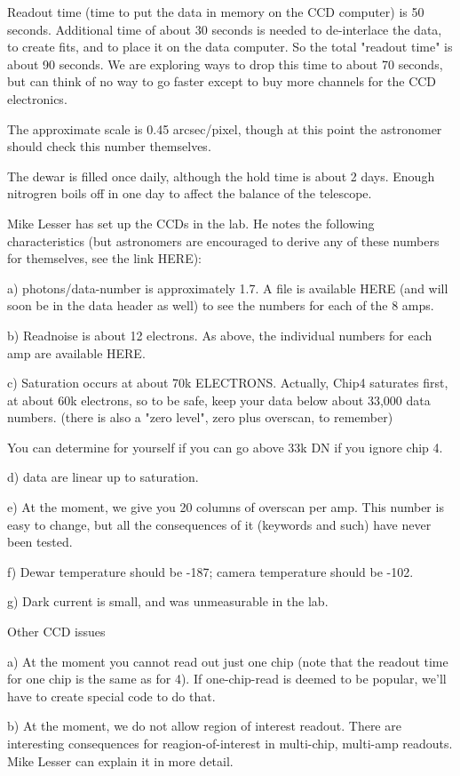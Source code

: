 \documentclass[letterpaper,12pt]{article}
\begin{document}
Readout time (time to put the data in memory on
the CCD computer) is 50 seconds. Additional time of about 30 seconds is
needed to de-interlace the data, to create fits, and to place it
on the data computer. So the total "readout time" is about
90 seconds. We are exploring ways to drop this time to about
70 seconds, but can think of no way to go faster except to
buy more channels for the CCD electronics.

The approximate scale is 0.45 arcsec/pixel, though at this point
the astronomer should check this number themselves.

The dewar is filled once daily, although the hold time
is about 2 days. Enough nitrogren boils off in one day
to affect the balance of the telescope.

Mike Lesser has set up the CCDs in the lab. He notes
the following characteristics (but astronomers are encouraged
to derive any of these numbers for themselves, see the link HERE):

a) photons/data-number is approximately 1.7. A file is
available HERE (and will soon be in the data header as well)
to see the numbers for each of the 8 amps.

b) Readnoise is about 12 electrons. As above, the
individual numbers for each amp are available HERE.

c) Saturation occurs at about 70k ELECTRONS.
   Actually, Chip4 saturates first, at about 60k electrons,
   so to be safe, keep your data below about 33,000 data numbers.
   (there is also a "zero level", zero plus overscan, to remember)

   You can determine for yourself if you can go above 33k DN
   if you ignore chip 4. 

d) data are linear up to saturation.

e) At the moment, we give you 20 columns of overscan
per amp. This number is easy to change, but all the consequences
of it (keywords and such) have never been tested.

f) Dewar temperature should be -187; camera temperature should
be -102.

g) Dark current is small, and was unmeasurable in the lab.


Other CCD issues

a) At the moment you cannot read out just one chip (note that
the readout time for one chip is the same as for 4). If
one-chip-read is deemed to be popular, we'll have to create special
code to do that.

b) At the moment, we do not allow region of interest readout.
There are interesting consequences for reagion-of-interest in 
multi-chip, multi-amp readouts. Mike Lesser can explain
it in more detail.
\end{document}
